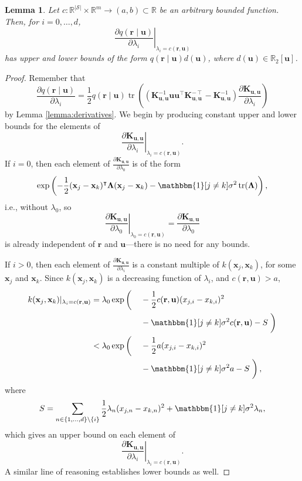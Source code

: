 \documentclass{mpaper}
\newtheorem{lemma}[theorem]{Lemma}
\DeclareMathOperator{\tr}{tr}
\newcommand{\Kuu}{\mathbf{K}_{\mathbf{u},\mathbf{u}}}
\begin{document}
\begin{lemma} \label{lemma:bound1} %
  Let $c : \mathbb{R}^{|\mathcal{S}|} \times \mathbb{R}^m \to (a, b) \subset
  \mathbb{R}$ be an arbitrary bounded function. Then, for $i = 0,
  \dots, d$,
  \[
    \left. \frac{\partial q(\mathbf{r} \mid \mathbf{u})}{\partial \lambda_i} \right|_{\lambda_i
      = c(\mathbf{r}, \mathbf{u})}
  \]
  has upper and lower bounds of the form $q(\mathbf{r} \mid \mathbf{u})d(\mathbf{u})$, where
  $d(\mathbf{u}) \in \mathbb{R}_2[\mathbf{u}]$.
\end{lemma}
\begin{proof}
  Remember that
  \[
    \frac{\partial q(\mathbf{r} \mid \mathbf{u})}{\partial \lambda_i} =
    \frac{1}{2}q(\mathbf{r} \mid \mathbf{u})\tr
    \left((\Kuu^{-1}\mathbf{u}\mathbf{u}^\intercal\Kuu^{-\intercal} - \Kuu^{-1})
      \frac{\partial \Kuu}{\partial \lambda_i}
    \right)
  \]
  by Lemma \ref{lemma:derivatives}. We begin by producing constant upper and
  lower bounds for the elements of
  \[
    \left. \frac{\partial \Kuu}{\partial \lambda_i} \right|_{\lambda_i =
      c(\mathbf{r}, \mathbf{u})}.
  \]
  If $i = 0$, then each element of $\frac{\partial
    \Kuu}{\partial \lambda_0}$ is of the form
  \[
    \exp \left( -\frac{1}{2}(\mathbf{x}_j - \mathbf{x}_k)^\intercal
      \bm\Lambda (\mathbf{x}_j - \mathbf{x}_k) - \mathbbm{1}[j \ne
      k]\sigma^2\tr(\bm\Lambda) \right),
  \]
  i.e., without $\lambda_0$, so
  \[
    \left. \frac{\partial \Kuu}{\partial \lambda_0} \right|_{\lambda_0 =
      c(\mathbf{r}, \mathbf{u})} = \frac{\partial \Kuu}{\partial \lambda_0}
  \]
  is already independent of $\mathbf{r}$ and $\mathbf{u}$---there is no need
  for any bounds.

  If $i > 0$, then each element of $\frac{\partial \Kuu}{\partial
    \lambda_i}$ is a constant multiple of $k(\mathbf{x}_j,
  \mathbf{x}_k)$, for some $\mathbf{x}_j$ and $\mathbf{x}_k$. Since
  $k(\mathbf{x}_j, \mathbf{x}_k)$ is a decreasing function of
  $\lambda_i$, and $c(\mathbf{r}, \mathbf{u}) > a$,
  \begin{alignat*}{3}
    k(\mathbf{x}_j, \mathbf{x}_k)|_{\lambda_i = c(\mathbf{r},
      \mathbf{u})} &= \lambda_0 \exp \left( \vphantom{\frac{1}{2}} \right. &&
    -\frac{1}{2} c(\mathbf{r}, \mathbf{u})(x_{j,i} - x_{k,i})^2 \\
    & && - \mathbbm{1}[j \ne k]\sigma^2c(\mathbf{r}, \mathbf{u}) - S \left.
      \vphantom{\frac{1}{2}} \right) \\
    &< \lambda_0 \exp \left( \vphantom{\frac{1}{2}} \right. && -\frac{1}{2}
    a(x_{j,i} - x_{k,i})^2 \\
    & && - \mathbbm{1}[j \ne k]\sigma^2a - S \left. \vphantom{\frac{1}{2}}
    \right),
  \end{alignat*}
  where
  \[
    S = \sum_{n \in \{ 1, \dots, d \} \setminus \{ i \}} \frac{1}{2}
    \lambda_n(x_{j,n} - x_{k,n})^2 + \mathbbm{1}[j \ne k]\sigma^2 \lambda_n,
  \]
  which gives an upper bound on each element of
  \[
    \left. \frac{\partial \Kuu}{\partial \lambda_i} \right|_{\lambda_i =
      c(\mathbf{r}, \mathbf{u})}.
  \]
  A similar line of reasoning establishes lower bounds as well.


\end{proof}
\end{document}
